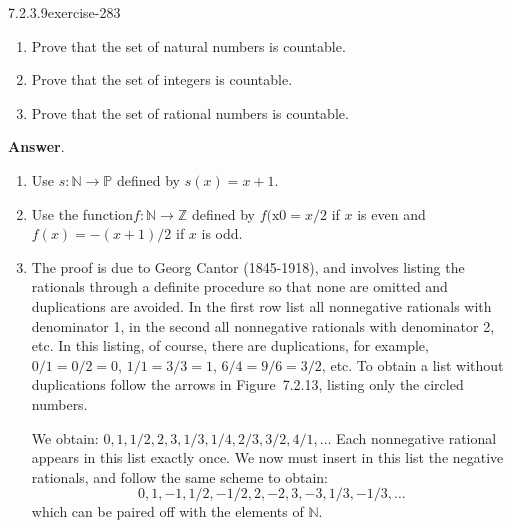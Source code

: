 \documentclass[twoside,10pt,]{book}
\numberwithin{equation}{section}
\begin{document}
\begin{divisionsolution}{7.2.3.9}{}{exercise-283}%
\hypertarget{p-2389}{}%
\leavevmode%
\begin{enumerate}[label=(\alph*)]
\item\hypertarget{li-1232}{}\hypertarget{p-2390}{}%
Prove that the set of natural numbers is countable.%
\item\hypertarget{li-1233}{}\hypertarget{p-2391}{}%
Prove that the set of integers is countable.%
\item\hypertarget{li-1234}{}\hypertarget{p-2392}{}%
Prove that the set of rational numbers is countable.%
\end{enumerate}
%
\par\smallskip%
\noindent\textbf{Answer}.\quad%
\hypertarget{p-2393}{}%
\leavevmode%
\begin{enumerate}[label=(\alph*)]
\item\hypertarget{li-1235}{}\hypertarget{p-2394}{}%
Use \(s:\mathbb{N}\to \mathbb{P}\) defined by \(s(x)=x+1\).%
\item\hypertarget{li-1236}{}\hypertarget{p-2395}{}%
Use the function\(f:\mathbb{N}\to \mathbb{Z}\) defined by \(f(\text{x0}=x/2\) if \(x\) is even and \(f(x)=-(x+1)/2\) if \(x\) is odd.%
\item\hypertarget{li-1237}{}\hypertarget{p-2396}{}%
The proof is due to Georg Cantor (1845-1918), and involves listing the rationals through a definite procedure so that none are omitted and duplications are avoided. In the first row list all nonnegative rationals with denominator 1, in the second all nonnegative rationals with denominator 2, etc. In this listing, of course, there are duplications, for example, \(0/1=0/2=0\), \(1/1=3/3=1\), \(6/4=9/6=3/2\), etc. To obtain a list without duplications follow the arrows in Figure~7.2.13, listing only the circled numbers.%
\par
\hypertarget{p-2397}{}%
We obtain: \(0,1,1/2,2,3,1/3,1/4,2/3,3/2,4/1,\ldots\) Each nonnegative rational appears in this list exactly once. We now must insert in this list the negative rationals, and follow the same scheme to obtain:%
\begin{equation*}
0,1,-1,1/2,-1/2,2,-2,3,-3,1/3,-1/3, \ldots
\end{equation*}
which can be paired off with the elements of \(\mathbb{N}\).%
\end{enumerate}
%
\begin{figure}
\centering

\end{figure}
\end{divisionsolution}
\end{document}
